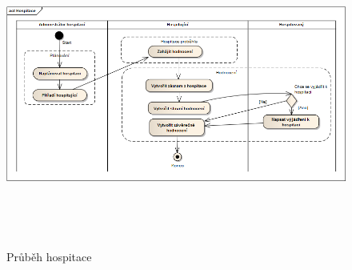 \begin{figure}[h]
\begin{center}
\includegraphics[height=10cm,angle=270]{figures/hospitace}
\caption{Průběh hospitace}
\label{fig:hospitace}
\end{center}
\end{figure}
